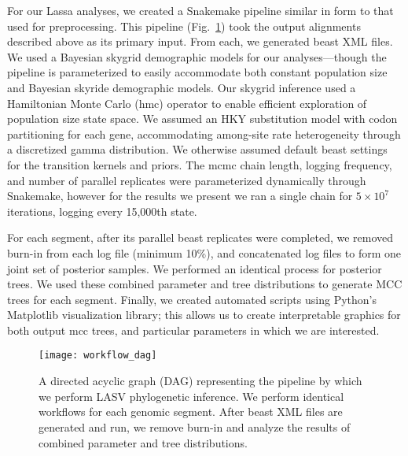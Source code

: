For our Lassa analyses, we created a Snakemake pipeline similar in form to that used for preprocessing.
This pipeline (Fig.~\ref{fig:workflow_dag}) took the output alignments described above as its primary input.
From each, we generated \gls{beast} XML files.
We used a Bayesian skygrid demographic models for our analyses---though the pipeline is parameterized to easily accommodate both constant population size and Bayesian skyride\cite{minin2008smooth} demographic models.
Our skygrid inference used a Hamiltonian Monte Carlo (\gls{hmc}) operator to enable efficient exploration of population size state space\cite{baele2020hamiltonian}.
We assumed an HKY substitution model with codon partitioning for each gene, accommodating among-site rate heterogeneity through a discretized gamma distribution.
We otherwise assumed default \gls{beast} settings for the transition kernels and priors.
The \gls{mcmc} chain length, logging frequency, and number of parallel replicates were parameterized dynamically through Snakemake, however for the results we present we ran a single chain for $5\times10^7$ iterations, logging every 15,000th state.

For each segment, after its parallel \gls{beast} replicates were completed, we removed burn-in from each log file (minimum 10\%), and concatenated log files to form one joint set of posterior samples.
We performed an identical process for posterior trees. %
We used these combined parameter and tree distributions to generate MCC trees for each segment.
Finally, we created automated scripts using Python's Matplotlib \cite{hunter2007matplotlib} visualization library; this allows us to create interpretable graphics for both output \gls{mcc} trees, and particular parameters in which we are interested.

\begin{figure}[ht]
  \centering
  \medskip
  \texttt{[image: workflow\_dag]}
  \caption[LASV phylogenetics pipeline]{A directed acyclic graph (DAG) representing the pipeline by which we perform LASV phylogenetic inference. We perform identical workflows for each genomic segment. After \gls{beast} XML files are generated and run, we remove burn-in and analyze the results of combined parameter and tree distributions.}
  \label{fig:workflow_dag}
\end{figure}

